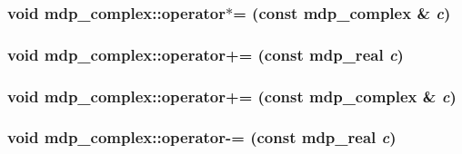\label{classmdp__complex_af073e0a4d5e1dd7495797b42312d35cb}
\hypertarget{classmdp__complex_a66c98af6209f0a424413f08f75626b61}{
\subsubsection[{operator$\ast$=}]{\setlength{\rightskip}{0pt plus 5cm}void mdp\_\-complex::operator$\ast$= (const {\bf mdp\_\-complex} \& {\em c})}}
\label{classmdp__complex_a66c98af6209f0a424413f08f75626b61}
\hypertarget{classmdp__complex_aead1214077dc876c3f674e5fcd9717a5}{
\subsubsection[{operator+=}]{\setlength{\rightskip}{0pt plus 5cm}void mdp\_\-complex::operator+= (const {\bf mdp\_\-real} {\em c})}}
\label{classmdp__complex_aead1214077dc876c3f674e5fcd9717a5}
\hypertarget{classmdp__complex_a082aab81b5bc1b42e1ad09bd0f52d710}{
\subsubsection[{operator+=}]{\setlength{\rightskip}{0pt plus 5cm}void mdp\_\-complex::operator+= (const {\bf mdp\_\-complex} \& {\em c})}}
\label{classmdp__complex_a082aab81b5bc1b42e1ad09bd0f52d710}
\hypertarget{classmdp__complex_a5388821dab285a814eef49281c3a69e4}{
\subsubsection[{operator-\/=}]{\setlength{\rightskip}{0pt plus 5cm}void mdp\_\-complex::operator-\/= (const {\bf mdp\_\-real} {\em c})}}
\label{classmdp__complex_a5388821dab285a814eef49281c3a69e4}
